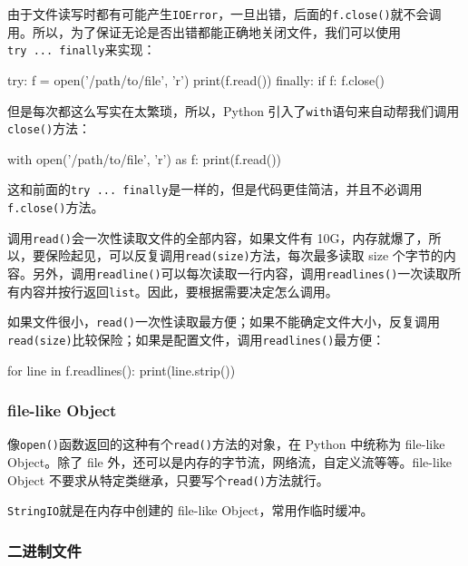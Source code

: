 由于文件读写时都有可能产生\texttt{IOError}，一旦出错，后面的\texttt{f.close()}就不会调用。所以，为了保证无论是否出错都能正确地关闭文件，我们可以使用\texttt{try\ ...\ finally}来实现：

\begin{pythoncode}
try:
    f = open('/path/to/file', 'r')
    print(f.read())
finally:
    if f:
        f.close()
\end{pythoncode}

但是每次都这么写实在太繁琐，所以，Python
引入了\texttt{with}语句来自动帮我们调用\texttt{close()}方法：

\begin{pythoncode}
with open('/path/to/file', 'r') as f:
    print(f.read())
\end{pythoncode}

这和前面的\texttt{try\ ...\ finally}是一样的，但是代码更佳简洁，并且不必调用\texttt{f.close()}方法。

调用\texttt{read()}会一次性读取文件的全部内容，如果文件有
10G，内存就爆了，所以，要保险起见，可以反复调用\texttt{read(size)}方法，每次最多读取
size
个字节的内容。另外，调用\texttt{readline()}可以每次读取一行内容，调用\texttt{readlines()}一次读取所有内容并按行返回\texttt{list}。因此，要根据需要决定怎么调用。

如果文件很小，\texttt{read()}一次性读取最方便；如果不能确定文件大小，反复调用\texttt{read(size)}比较保险；如果是配置文件，调用\texttt{readlines()}最方便：

\begin{pythoncode}
for line in f.readlines():
    print(line.strip()) 
\end{pythoncode}

\hypertarget{file-like-object}{%
\subsubsection{file-like Object}\label{file-like-object}}

像\texttt{open()}函数返回的这种有个\texttt{read()}方法的对象，在 Python
中统称为 file-like Object。除了 file
外，还可以是内存的字节流，网络流，自定义流等等。file-like Object
不要求从特定类继承，只要写个\texttt{read()}方法就行。

\texttt{StringIO}就是在内存中创建的 file-like Object，常用作临时缓冲。

\hypertarget{ux4e8cux8fdbux5236ux6587ux4ef6}{%
\subsubsection{二进制文件}\label{ux4e8cux8fdbux5236ux6587ux4ef6}}

